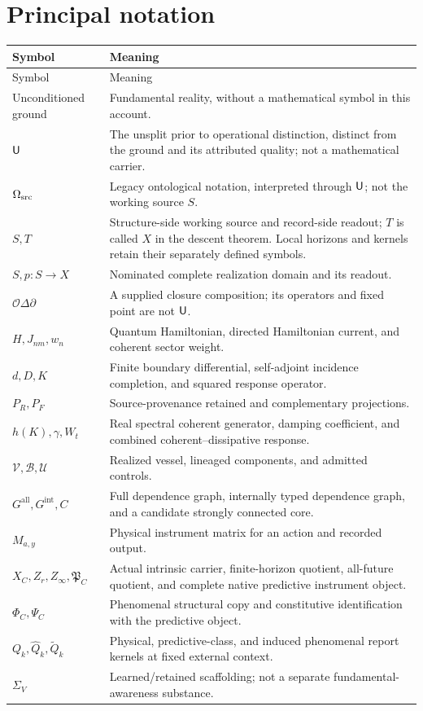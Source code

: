 \section{Principal notation}\label{section:ledger:principal-notation}
\begin{longtable}{@{}p{}p{}@{}}
\toprule Symbol & Meaning\\\midrule\endfirsthead
\toprule Symbol & Meaning\\\midrule\endhead
Unconditioned ground & Fundamental reality, without a mathematical symbol in this account.\\
$\mathsf{U}$ & The unsplit prior to operational distinction, distinct from the ground and its attributed quality; not a mathematical carrier.\\
$\Omega_{\mathrm{src}}$ & Legacy ontological notation, interpreted through $\mathsf{U}$; not the working source $S$.\\
$S,T$ & Structure-side working source and record-side readout; $T$ is called $X$ in the descent theorem. Local horizons and kernels retain their separately defined symbols.\\
$S,p:S\to X$ & Nominated complete realization domain and its readout.\\
$\mathcal O\Delta\partial$ & A supplied closure composition; its operators and fixed point are not $\mathsf{U}$.\\
$H,J_{nm},w_n$ & Quantum Hamiltonian, directed Hamiltonian current, and coherent sector weight.\\
$d,D,K$ & Finite boundary differential, self-adjoint incidence completion, and squared response operator.\\
$P_R,P_F$ & Source-provenance retained and complementary projections.\\
$h(K),\gamma,W_t$ & Real spectral coherent generator, damping coefficient, and combined coherent--dissipative response.\\
$\mathcal V,\mathcal B,\mathcal U$ & Realized vessel, lineaged components, and admitted controls.\\
$G^{\mathrm{all}},G^{\mathrm{int}},C$ & Full dependence graph, internally typed dependence graph, and a candidate strongly connected core.\\
$M_{a,y}$ & Physical instrument matrix for an action and recorded output.\\
$X_C,Z_r,Z_\infty,\mathfrak P_C$ & Actual intrinsic carrier, finite-horizon quotient, all-future quotient, and complete native predictive instrument object.\\
$\Phi_C,\Psi_C$ & Phenomenal structural copy and constitutive identification with the predictive object.\\
$Q_k,\widehat Q_k,\widetilde Q_k$ & Physical, predictive-class, and induced phenomenal report kernels at fixed external context.\\
$\Sigma_V$ & Learned/retained scaffolding; not a separate fundamental-awareness substance.\\
\bottomrule
\end{longtable}

